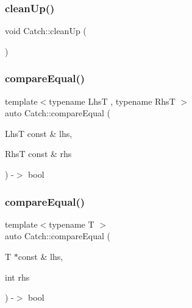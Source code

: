 \mbox{\label{namespaceCatch_a0f78e9afdebc6d4512d18e76fbf54b8c}} 
\subsubsection{\texorpdfstring{clean\+Up()}{cleanUp()}}
{\footnotesize\ttfamily void Catch\+::clean\+Up (\begin{DoxyParamCaption}{ }\end{DoxyParamCaption})}

\mbox{\label{namespaceCatch_af89b8df30cfaf09abd048c6ff67359ee}} 
\subsubsection{\texorpdfstring{compare\+Equal()}{compareEqual()}\hspace{0.1cm}{\footnotesize\ttfamily [1/5]}}
{\footnotesize\ttfamily template$<$typename LhsT , typename RhsT $>$ \\
auto Catch\+::compare\+Equal (\begin{DoxyParamCaption}\item[{LhsT const \&}]{lhs,  }\item[{RhsT const \&}]{rhs }\end{DoxyParamCaption}) -\/$>$ bool }

\mbox{\label{namespaceCatch_a68f451c45e65f242dde5f21c19a4cf7a}} 
\subsubsection{\texorpdfstring{compare\+Equal()}{compareEqual()}\hspace{0.1cm}{\footnotesize\ttfamily [2/5]}}
{\footnotesize\ttfamily template$<$typename T $>$ \\
auto Catch\+::compare\+Equal (\begin{DoxyParamCaption}\item[{T $\ast$const \&}]{lhs,  }\item[{int}]{rhs }\end{DoxyParamCaption}) -\/$>$ bool }

